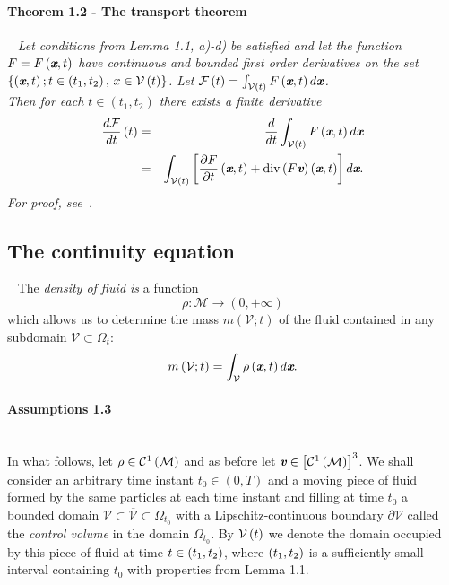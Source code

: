 \paragraph{Theorem 1.2 - The transport theorem}
\ \newline
\itshape
Let conditions from Lemma 1.1, a)-d) be satisfied and let the function $F = F\left(\textit{\textbf{x}},t\right)$ have continuous and bounded first order derivatives on the set \\$\left\{\left(\textit{\textbf{x}},t\right);t\in\left(t_1,t_2\right),\,x\in\mathcal{V}\left(t\right)\right\}$. Let $\mathcal{F}\left({t}\right) = \int_{\mathcal{V}\left(t\right)}F\left(\textit{\textbf{x}},t\right) d\textit{\textbf{x}}$.
\\
Then for each $t\in\left(t_1,t_2\right)$ there exists a finite derivative
\begin{eqnarray}
\nonumber\frac{d\mathcal{F}}{dt}\left({t}\right)
& = &
\frac{d}{dt}\int_{\mathcal{V}\left(t\right)}F\left(\textit{\textbf{x}},t\right) d\textit{\textbf{x}}
 \\
& = & \int_{\mathcal{V}\left(t\right)}
	\left[
		\frac{\partial{F}}{\partial{t}}\left(\textit{\textbf{x}},t\right)
		+
		\mathrm{div}\left(F\textit{\textbf{v}}\right)\left(\textit{\textbf{x}},t\right)\right] d\textit{\textbf{x}}.
\end{eqnarray}\upshape
For proof, see~\cite{compress}.
\subsection{The continuity equation}
\ \newline
The \textit{density of fluid is} a function
$$\rho:\mathcal{M} \longrightarrow \left(0,+\infty\right)$$
which allows us to determine the mass $m\left(\mathcal{V};t\right)$ of the fluid contained in any subdomain $\mathcal{V}\subset\Omega_{\textit{t}}:$
\begin{equation}\label{m}
 m\left(\mathcal{V};t\right) = \int_{\mathcal{V}}\rho\left(\textit{\textbf{x}},t\right)d\textit{\textbf{x}}.
\end{equation}
\paragraph{Assumptions 1.3}\label{assumption}\ \\
In what follows, let $\rho\in\mathcal{C}^1\left({}\mathcal{M}\right) $ and as before let $\textit{\textbf{v}}\in\left[\mathcal{C}^1\left(\mathcal{M}\right)\right]^3$. We shall consider an arbitrary time instant $t_0 \in\left(0,T\right)$ and a moving piece of fluid formed by the same particles at each time instant and filling at time $t_0$ a bounded domain $\mathcal{V}\subset\overline{\mathcal{V}}\subset\Omega_{{t}_0}$ with a Lipschitz-continuous boundary $\partial\mathcal{V}$ called the \textit{control volume} in the domain $\Omega_{{t}_0}$. By $\mathcal{V}\left({t}\right) $ we denote the domain occupied by this piece of fluid at time $t\in\left({}t_1,t_2\right) $, where $\left({}t_1,t_2\right) $ is a sufficiently small interval containing $t_0$ with properties from Lemma 1.1.
